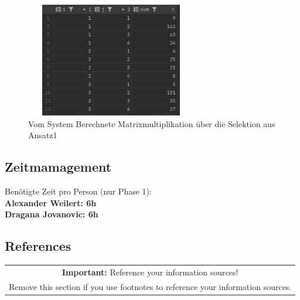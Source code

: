 \documentclass[11pt]{scrartcl}
\begin{document}
\begin{figure}[H]
    \begin{center}
        \includegraphics[width=7.5cm,height=5cm]{Selection_View_C.jpg}
        \caption{Vom System Berechnete Matrixmultiplikation über die Selektion aus Ansatz1}
    \end{center}
\end{figure}

\subsection*{Zeitmamagement}

Benötigte Zeit pro Person (nur Phase 1): \\
\textbf{Alexander Weilert: 6h} \\
\textbf{Dragana Jovanovic: 6h}

\subsection*{References}

\begin{table}[H]
  \centering
  \begin{tabular}{c}
    \hline
    \textbf{Important:} Reference your information sources!\tabularnewline
    Remove this section if you use footnotes to reference your information sources.\tabularnewline
    \hline
  \end{tabular}
\end{table}

\printbibliography[title=References]
\end{document}
